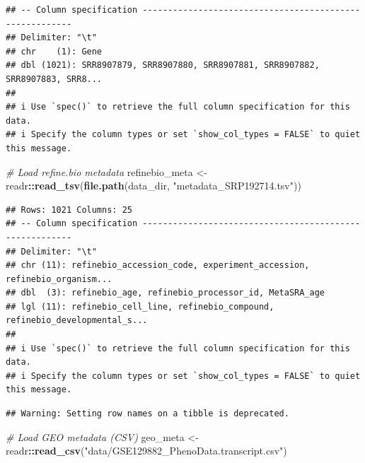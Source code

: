 \documentclass[
]{article}
\newenvironment{Shaded}{\begin{snugshade}}{\end{snugshade}}
\newcommand{\CommentTok}[1]{\textcolor[rgb]{0.56,0.35,0.01}{\textit{#1}}}
\newcommand{\FunctionTok}[1]{\textcolor[rgb]{0.13,0.29,0.53}{\textbf{#1}}}
\newcommand{\NormalTok}[1]{#1}
\newcommand{\OtherTok}[1]{\textcolor[rgb]{0.56,0.35,0.01}{#1}}
\newcommand{\SpecialCharTok}[1]{\textcolor[rgb]{0.81,0.36,0.00}{\textbf{#1}}}
\newcommand{\StringTok}[1]{\textcolor[rgb]{0.31,0.60,0.02}{#1}}
\begin{document}
\begin{verbatim}
## -- Column specification --------------------------------------------------------
## Delimiter: "\t"
## chr    (1): Gene
## dbl (1021): SRR8907879, SRR8907880, SRR8907881, SRR8907882, SRR8907883, SRR8...
## 
## i Use `spec()` to retrieve the full column specification for this data.
## i Specify the column types or set `show_col_types = FALSE` to quiet this message.
\end{verbatim}

\begin{Shaded}
\begin{Highlighting}[]
\CommentTok{\# Load refine.bio metadata}
\NormalTok{refinebio\_meta }\OtherTok{\textless{}{-}}\NormalTok{ readr}\SpecialCharTok{::}\FunctionTok{read\_tsv}\NormalTok{(}\FunctionTok{file.path}\NormalTok{(data\_dir, }\StringTok{"metadata\_SRP192714.tsv"}\NormalTok{))}
\end{Highlighting}
\end{Shaded}

\begin{verbatim}
## Rows: 1021 Columns: 25
## -- Column specification --------------------------------------------------------
## Delimiter: "\t"
## chr (11): refinebio_accession_code, experiment_accession, refinebio_organism...
## dbl  (3): refinebio_age, refinebio_processor_id, MetaSRA_age
## lgl (11): refinebio_cell_line, refinebio_compound, refinebio_developmental_s...
## 
## i Use `spec()` to retrieve the full column specification for this data.
## i Specify the column types or set `show_col_types = FALSE` to quiet this message.
\end{verbatim}

\begin{Shaded}
\end{Shaded}

\begin{verbatim}
## Warning: Setting row names on a tibble is deprecated.
\end{verbatim}

\begin{Shaded}
\begin{Highlighting}[]
\CommentTok{\# Load GEO metadata (CSV)}
\NormalTok{geo\_meta }\OtherTok{\textless{}{-}}\NormalTok{ readr}\SpecialCharTok{::}\FunctionTok{read\_csv}\NormalTok{(}\StringTok{"data/GSE129882\_PhenoData.transcript.csv"}\NormalTok{)}
\end{Highlighting}
\end{Shaded}
\end{document}

